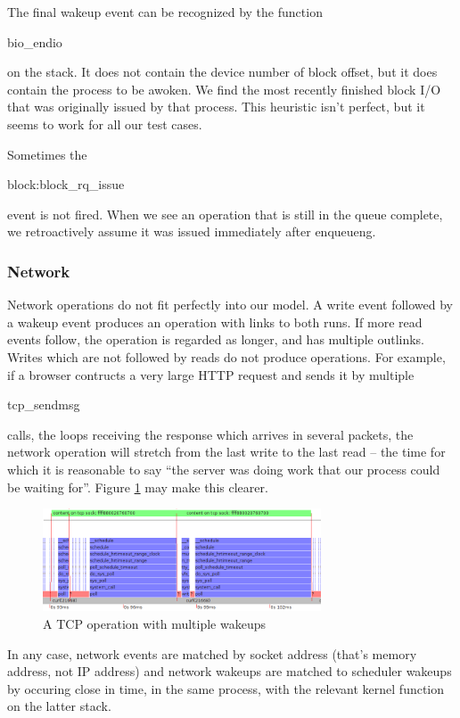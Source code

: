 \documentclass[10pt]{article}
\begin{document}
The final wakeup event can be recognized by the function \begin{tt}bio\_endio\end{tt} on the stack.  It does not contain the device number of block offset, but it does contain the process to be awoken.  We find the most recently finished block I/O that was originally issued by that process.  This heuristic isn't perfect, but it seems to work for all our test cases.

Sometimes the \begin{tt}block:block\_rq\_issue\end{tt} event is not fired.  When we see an operation that is still in the queue complete, we retroactively assume it was issued immediately after enqueueng.

\subsubsection{Network}

Network operations do not fit perfectly into our model.  A write event followed by a wakeup event produces an operation with links to both runs.  If more read events follow, the operation is regarded as longer, and has multiple outlinks.  Writes which are not followed by reads do not produce operations.  For example, if a browser contructs a very large HTTP request and sends it by multiple \begin{tt}tcp\_sendmsg\end{tt} calls, the loops receiving the response which arrives in several packets, the network operation will stretch from the last write to the last read -- the time for which it is reasonable to say ``the server was doing work that our process could be waiting for''.  Figure \ref{fig:tcp} may make this clearer. 

\begin{figure}[h]
\includegraphics[width=3.25in]{tcpexample}
\caption{A TCP operation with multiple wakeups}
\label{fig:tcp}
\end{figure}

In any case, network events are matched by socket address (that's memory address, not IP address) and network wakeups are matched to scheduler wakeups by occuring close in time, in the same process, with the relevant kernel function on the latter stack.
\end{document}
